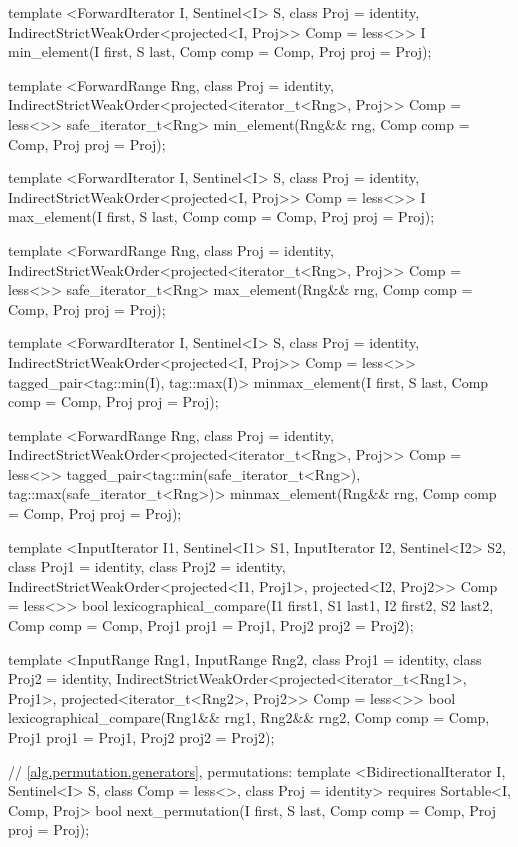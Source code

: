 \begin{codeblock}
{{{{  template <ForwardIterator I, Sentinel<I> S, class Proj = identity,
      IndirectStrictWeakOrder<projected<I, Proj>> Comp = less<>>
    I min_element(I first, S last, Comp comp = Comp{}, Proj proj = Proj{});

  template <ForwardRange Rng, class Proj = identity,
      IndirectStrictWeakOrder<projected<iterator_t<Rng>, Proj>> Comp = less<>>
    safe_iterator_t<Rng>
      min_element(Rng&& rng, Comp comp = Comp{}, Proj proj = Proj{});

  template <ForwardIterator I, Sentinel<I> S, class Proj = identity,
      IndirectStrictWeakOrder<projected<I, Proj>> Comp = less<>>
    I max_element(I first, S last, Comp comp = Comp{}, Proj proj = Proj{});

  template <ForwardRange Rng, class Proj = identity,
      IndirectStrictWeakOrder<projected<iterator_t<Rng>, Proj>> Comp = less<>>
    safe_iterator_t<Rng>
      max_element(Rng&& rng, Comp comp = Comp{}, Proj proj = Proj{});

  template <ForwardIterator I, Sentinel<I> S, class Proj = identity,
      IndirectStrictWeakOrder<projected<I, Proj>> Comp = less<>>
    tagged_pair<tag::min(I), tag::max(I)>
      minmax_element(I first, S last, Comp comp = Comp{}, Proj proj = Proj{});

  template <ForwardRange Rng, class Proj = identity,
      IndirectStrictWeakOrder<projected<iterator_t<Rng>, Proj>> Comp = less<>>
    tagged_pair<tag::min(safe_iterator_t<Rng>),
                tag::max(safe_iterator_t<Rng>)>
      minmax_element(Rng&& rng, Comp comp = Comp{}, Proj proj = Proj{});

  template <InputIterator I1, Sentinel<I1> S1, InputIterator I2, Sentinel<I2> S2,
      class Proj1 = identity, class Proj2 = identity,
      IndirectStrictWeakOrder<projected<I1, Proj1>, projected<I2, Proj2>> Comp = less<>>
    bool
      lexicographical_compare(I1 first1, S1 last1, I2 first2, S2 last2,
                              Comp comp = Comp{}, Proj1 proj1 = Proj1{}, Proj2 proj2 = Proj2{});

  template <InputRange Rng1, InputRange Rng2, class Proj1 = identity,
      class Proj2 = identity,
      IndirectStrictWeakOrder<projected<iterator_t<Rng1>, Proj1>,
        projected<iterator_t<Rng2>, Proj2>> Comp = less<>>
    bool
      lexicographical_compare(Rng1&& rng1, Rng2&& rng2, Comp comp = Comp{},
                              Proj1 proj1 = Proj1{}, Proj2 proj2 = Proj2{});

  // \ref{alg.permutation.generators}, permutations:
  template <BidirectionalIterator I, Sentinel<I> S, class Comp = less<>,
      class Proj = identity>
    requires Sortable<I, Comp, Proj>
    bool next_permutation(I first, S last, Comp comp = Comp{}, Proj proj = Proj{});

}}}}
\end{codeblock}
